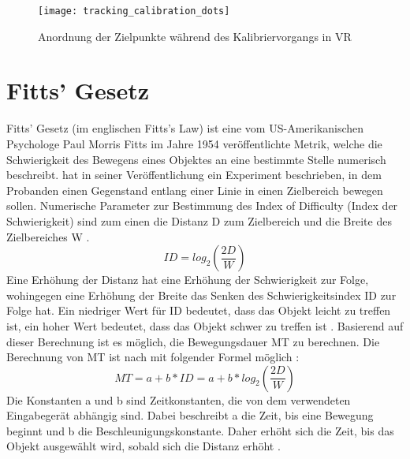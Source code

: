 \begin{figure}[!htbp]
	\centering
	\texttt{[image: tracking\_calibration\_dots]}
	\caption[Anordnung der Zielpunkte während des Kalibriervorgangs in VR]{Anordnung der Zielpunkte während des Kalibriervorgangs in \ac{VR}}
	\label{fig:Calibration-targets}
\end{figure}

\section{Fitts' Gesetz}
\label{section:FittsLaw}
Fitts' Gesetz (im englischen Fitts's Law) ist eine vom US-Amerikanischen Psychologe Paul Morris Fitts im Jahre 1954 veröffentlichte Metrik, welche die Schwierigkeit des Bewegens eines Objektes an eine bestimmte Stelle numerisch beschreibt. \citeauthor{Fitts.1992} hat in seiner Veröffentlichung ein Experiment beschrieben, in dem Probanden einen Gegenstand entlang einer Linie in einen Zielbereich bewegen sollen. Numerische Parameter zur Bestimmung des \glqq Index of Difficulty\grqq{} (Index der Schwierigkeit) sind zum einen die Distanz D zum Zielbereich und die Breite des Zielbereiches W \cite{Fitts.1992}. 
\begin{equation}
ID = log_2 \left ( \frac{2D}{W} \right )
\end{equation}
Eine Erhöhung der Distanz hat eine Erhöhung der Schwierigkeit zur Folge, wohingegen eine Erhöhung der Breite das Senken des Schwierigkeitsindex ID zur Folge hat. Ein niedriger Wert für ID bedeutet, dass das Objekt leicht zu treffen ist, ein hoher Wert bedeutet, dass das Objekt schwer zu treffen ist \cite{Fitts.1992}. 
Basierend auf dieser Berechnung ist es möglich, die Bewegungsdauer \ac{MT} zu berechnen. Die Berechnung von \ac{MT} ist nach \citeauthor{Graham.1996} mit folgender Formel möglich \cite{Graham.1996}:
\begin{equation}
MT = a + b * ID = a + b * log_2 \left ( \frac{2D}{W} \right )
\end{equation}
Die Konstanten a und b sind Zeitkonstanten, die von dem verwendeten Eingabegerät abhängig sind. Dabei beschreibt a die Zeit, bis eine Bewegung beginnt und b die Beschleunigungskonstante. Daher erhöht sich die Zeit, bis das Objekt ausgewählt wird, sobald sich die Distanz erhöht \cite{Graham.1996}.

